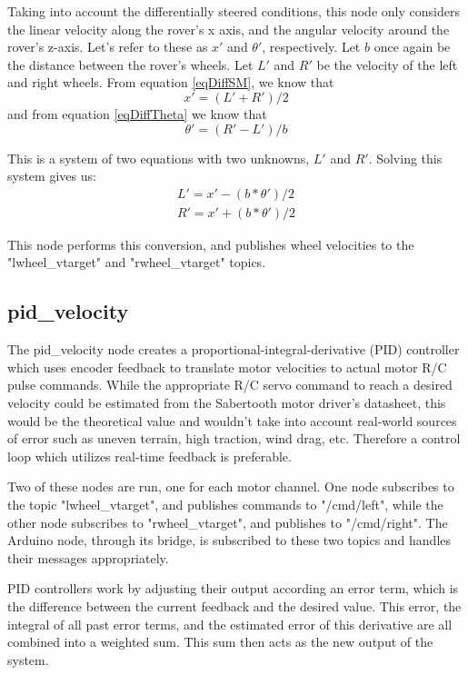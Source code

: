 Taking into account the differentially steered conditions, this node only considers the linear velocity along the rover's x axis, and the angular velocity around the rover's z-axis. Let's refer to these as \(x'\) and \(\theta '\), respectively. Let \(b\) once again be the distance between the rover's wheels. Let \(L'\) and \(R'\) be the velocity of the left and right wheels. From equation \ref{eqDiffSM}, we know that
\begin{equation*}
x' = (L' + R') / 2
\end{equation*}
and from equation \ref{eqDiffTheta} we know that
\begin{equation*}
\theta ' = (R' - L') / b
\end{equation*}

This is a system of two equations with two unknowns, \(L'\) and \(R'\). Solving this system gives us: 
\begin{multline*}
L' = x' - (b * \theta ') / 2 \\
R' = x' + (b * \theta ') / 2
\end{multline*}

This node performs this conversion, and publishes wheel velocities to the "lwheel\_vtarget" and "rwheel\_vtarget" topics. 

\subsection{pid\_velocity}
The pid\_velocity node creates a  proportional-integral-derivative (PID) controller which uses encoder feedback to translate motor velocities to actual motor R/C pulse commands. While the appropriate R/C servo command to reach a desired velocity could be estimated from the Sabertooth motor driver's datasheet, this would be the theoretical value and wouldn't take into account real-world sources of error such as uneven terrain, high traction, wind drag, etc. Therefore a control loop which utilizes real-time feedback is preferable.

Two of these nodes are run, one for each motor channel. One node subscribes to the topic "lwheel\_vtarget", and publishes commands to "/cmd/left", while the other node subscribes to "rwheel\_vtarget", and publishes to "/cmd/right". The Arduino node, through its bridge, is subscribed to these two topics and handles their messages appropriately.

PID controllers work by adjusting their output according an error term, which is the difference between the current feedback and the desired value. This error, the integral of all past error terms, and the estimated error of this derivative are all combined into a weighted sum. This sum then acts as the new output of the system.

